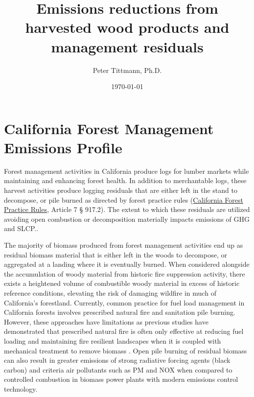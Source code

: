 \documentclass[a4paper]{article}
\author{Peter Tittmann, Ph.D.}
\date{\today}
\title{Emissions reductions from harvested wood products and management residuals}
\begin{document}
\maketitle
\tableofcontents

\pagebreak
\thispagestyle{empty}

\listoffigures

\listoftables

\newpage


\section{California Forest Management Emissions Profile}
\label{sec:orgheadline3}

Forest management activities in California produce logs for lumber markets while maintaining and enhancing forest health. In addition to merchantable logs, these harvest activities produce logging residuals that are either left in the stand to decompose, or pile burned as directed by forest practice rules (\href{http://calfire.ca.gov/resource_mgt/downloads/2013_FP_Rulebook_with_Tech_RuleNo1.pdf}{California Forest Practice Rules}, Article 7 §
917.2). The extent to which these residuals are utilized avoiding open combustion or decomposition materially impacts emissions of \ac{GHG} and \ac{SLCP}..

The majority of biomass produced from forest management activities end up as residual biomass material that is either left in the woods to decompose, or aggregated at a landing where it is eventually burned. When considered alongside the accumulation of woody material from historic fire suppression activity, there exists a heightened volume of combustible woody material in excess of historic reference conditions, elevating the risk of damaging wildfire in much of California’s forestland. Currently, common practice for fuel load management in California forests involves prescribed natural fire and sanitation pile burning. However, these approaches have limitations as previous studies have demonstrated that prescribed natural fire is often only effective at reducing fuel loading and maintaining fire resilient landscapes when it is coupled with mechanical treatment to remove biomass \cite{Stephens2009c}. Open pile burning of residual biomass can also result in greater emissions of strong radiative forcing agents (black carbon) and criteria air pollutants such as \ac{PM} and \ac{NOX} when compared to controlled combustion in biomass power plants with modern emissions control technology. 
\end{document}
